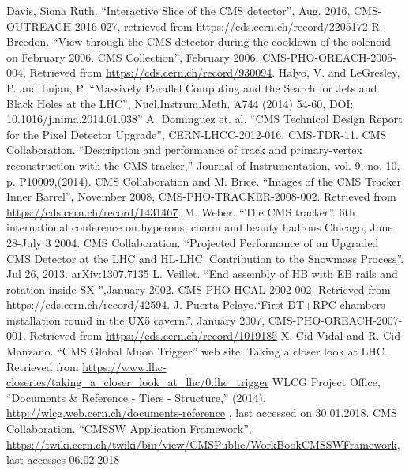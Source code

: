 \documentclass[print]{nuthesis}
\begin{document}
\begin{thebibliography}{300}
 Davis, Siona Ruth. ``Interactive Slice of the CMS detector'', Aug. 2016, CMS-OUTREACH-2016-027, retrieved from \url{https://cds.cern.ch/record/2205172}  
 R. Breedon. ``View through the CMS detector during the cooldown of the solenoid on February 2006. CMS Collection'', February 2006, CMS-PHO-OREACH-2005-004, Retrieved from \url{https://cds.cern.ch/record/930094}.
 Halyo, V. and LeGresley, P. and Lujan, P. ``Massively Parallel Computing and the Search for Jets and Black Holes at the LHC'', Nucl.Instrum.Meth. A744 (2014) 54-60, DOI: 10.1016/j.nima.2014.01.038''
 A. Dominguez et. al. ``CMS Technical Design Report for the Pixel Detector Upgrade'', CERN-LHCC-2012-016. CMS-TDR-11.
 CMS Collaboration. ``Description and performance of track and primary-vertex reconstruction with the CMS tracker,'' Journal of Instrumentation, vol. 9, no. 10, p. P10009,(2014).
 CMS Collaboration and M. Brice. ``Images of the CMS Tracker Inner Barrel'', November 2008, CMS-PHO-TRACKER-2008-002. Retrieved from \url{https://cds.cern.ch/record/1431467}.
 M. Weber. ``The CMS tracker''. 6th international conference on hyperons, charm and beauty hadrons Chicago, June 28-July 3 2004.
 CMS Collaboration. ``Projected Performance of an Upgraded CMS Detector at the LHC and HL-LHC: Contribution to the Snowmass Process''. Jul 26, 2013. arXiv:1307.7135
 L. Veillet. ``End assembly of HB with EB rails and rotation inside SX '',January 2002. CMS-PHO-HCAL-2002-002. Retrieved from \url{https://cds.cern.ch/record/42594}.
 J. Puerta-Pelayo.``First DT+RPC chambers installation round in the UX5 cavern.''. January 2007, CMS-PHO-OREACH-2007-001. Retrieved from \url{https://cds.cern.ch/record/1019185}
 X. Cid Vidal and R. Cid Manzano. ``CMS Global Muon Trigger'' web site: Taking a closer look at LHC. Retrieved from \url{https://www.lhc-closer.es/taking\_a\_closer\_look\_at\_lhc/0.lhc\_trigger}
 WLCG Project Office, ``Documents \& Reference - Tiers - Structure,'' (2014). \url{http://wlcg.web.cern.ch/documents-reference} , last accessed on 30.01.2018.
CMS Collaboration. ``CMSSW Application Framework'', \url{https://twiki.cern.ch/twiki/bin/view/CMSPublic/WorkBookCMSSWFramework}, last accesses 06.02.2018 


\end{thebibliography}
\end{document}
